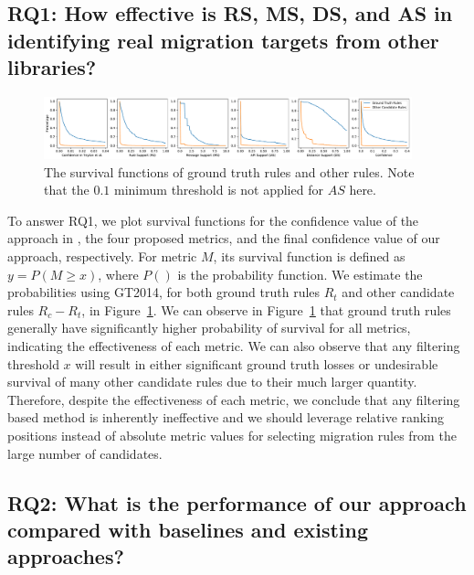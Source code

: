 \documentclass[conference, 10pt]{IEEEtran}
\begin{document}
\subsection{RQ1: How effective is RS, MS, DS, and AS in identifying real migration targets from other libraries?}

\begin{figure}[tb]
  \centering
  \includegraphics[width=0.95\textwidth]{fig/dist.pdf}
  \caption{The survival functions of ground truth rules and other rules. Note that the $0.1$ minimum threshold is not applied for $AS$ here.}
  \label{fig:dist}
\vspace{-5mm}
\end{figure}

To answer RQ1, we plot survival functions for the confidence value of the approach in \cite{2012WCRE-Teyton-Mining},
the four proposed metrics, and the final confidence value of our approach, respectively. For metric $M$, its survival function is defined as $y=P(M\ge x)$, where $P()$ is the probability function.
We estimate the probabilities using GT2014, for both ground truth rules $R_t$ and other candidate rules $R_c-R_t$,
in Figure~\ref{fig:dist}. 
We can observe in Figure~\ref{fig:dist} that ground truth rules generally have significantly higher probability of survival for all metrics, indicating the effectiveness of each metric.
We can also observe that any filtering threshold $x$ will result in either significant ground truth losses or undesirable survival of many other candidate rules due to their much larger quantity.
Therefore, despite the effectiveness of each metric, we conclude that any filtering based method is inherently ineffective and we should leverage relative ranking positions instead of absolute metric values for selecting migration rules from the large number of candidates.

\subsection{RQ2: What is the performance of our approach compared with  baselines and existing approaches?}\label{ss:rq2}
\end{document}

